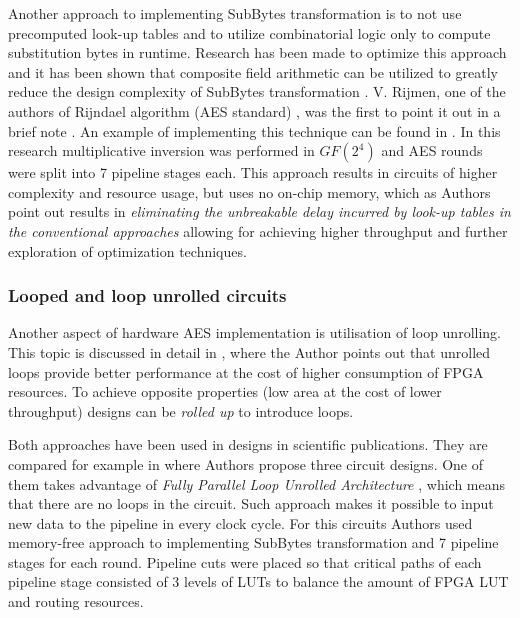 Another approach to implementing SubBytes transformation is to not use precomputed look-up tables and to utilize combinatorial logic only to compute substitution bytes in runtime. Research has been made to optimize this approach and it has been shown that composite field arithmetic can be utilized to greatly reduce the design complexity of SubBytes transformation \cite{morioka2002optimized, rudra2001efficient, canright2005very, satoh2001compact, wong2018circuit}. V. Rijmen, one of the authors of Rijndael algorithm (AES standard) \cite{daemen1999aes}, was the first to point it out in a brief note \cite{rijmen2000efficient}. An example of implementing this technique can be found in \cite{vlsi}. In this research multiplicative inversion was performed in $GF(2^4)$ and AES rounds were split into 7 pipeline stages each. This approach results in circuits of higher complexity and resource usage, but uses no on-chip memory, which as Authors point out results in \textit{eliminating the unbreakable delay incurred by look-up tables in the conventional approaches} allowing for achieving higher throughput and further exploration of optimization techniques.



\subsubsection{Looped and loop unrolled circuits}
Another aspect of hardware AES implementation is utilisation of loop unrolling. This topic is discussed in detail in \cite[Chapters 1.1, 2.1]{kilts2007advanced}, where the Author points out that unrolled loops provide better performance at the cost of higher consumption of FPGA resources. To achieve opposite properties (low area at the cost of lower throughput) designs can be \textit{rolled up} to introduce loops.

Both approaches have been used in designs in scientific publications. They are compared for example in \cite{good2005aes} where Authors propose three circuit designs. One of them takes advantage of \textit{Fully Parallel Loop Unrolled Architecture} \cite[Section 2.1]{good2005aes}, which means that there are no loops in the circuit. Such approach makes it possible to input new data to the pipeline in every clock cycle. For this circuits Authors used memory-free approach to implementing SubBytes transformation and 7 pipeline stages for each round. Pipeline cuts were placed so that critical paths of each pipeline stage consisted of 3 levels of LUTs to balance the amount of FPGA LUT and routing resources.

